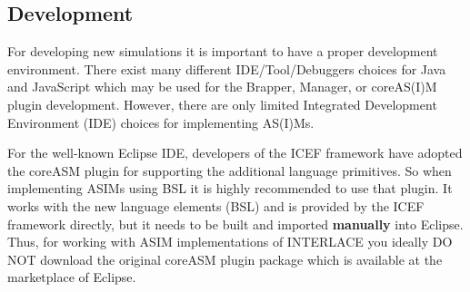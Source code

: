 \subsection{Development}
\label{sec:development}
For developing new simulations it is important to have a proper development environment. There exist many different IDE/Tool/Debuggers choices for Java and JavaScript which may be used for the Brapper, Manager, or coreAS(I)M plugin development. However, there are only limited Integrated Development Environment (IDE) choices for implementing AS(I)Ms.

For the well-known Eclipse IDE, developers of the ICEF framework have adopted the coreASM plugin for supporting the additional language primitives. So when implementing ASIMs using BSL it is highly recommended to use that plugin. It works with the new language elements (BSL) and is provided by the ICEF framework directly, but it needs to be built and imported \textbf{manually} into Eclipse. Thus, for working with ASIM implementations of INTERLACE you ideally DO NOT download the original coreASM plugin package which is available at the marketplace of Eclipse.

